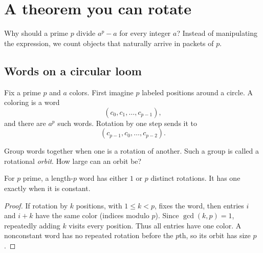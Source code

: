 \chapter{A theorem you can rotate}
\label{chap:necklaces}

Why should a prime $p$ divide $a^p-a$ for every integer $a$? Instead of manipulating the expression, we count objects that naturally arrive in packets of $p$.

\section{Words on a circular loom}

Fix a prime $p$ and $a$ colors. First imagine $p$ labeled positions around a circle. A coloring is a word
\[
(c_0,c_1,\dots,c_{p-1}),
\]
and there are $a^p$ such words. Rotation by one step sends it to
\[
(c_{p-1},c_0,\dots,c_{p-2}).
\]

\begin{center}
\end{center}

Group words together when one is a rotation of another. Such a group is called a rotational \emph{orbit}. How large can an orbit be?

\begin{lemma}
For $p$ prime, a length-$p$ word has either $1$ or $p$ distinct rotations. It has one exactly when it is constant.
\end{lemma}

\begin{proof}
If rotation by $k$ positions, with $1\le k<p$, fixes the word, then entries $i$ and $i+k$ have the same color (indices modulo $p$). Since $\gcd(k,p)=1$, repeatedly adding $k$ visits every position. Thus all entries have one color. A nonconstant word has no repeated rotation before the $p$th, so its orbit has size $p$.
\end{proof}


